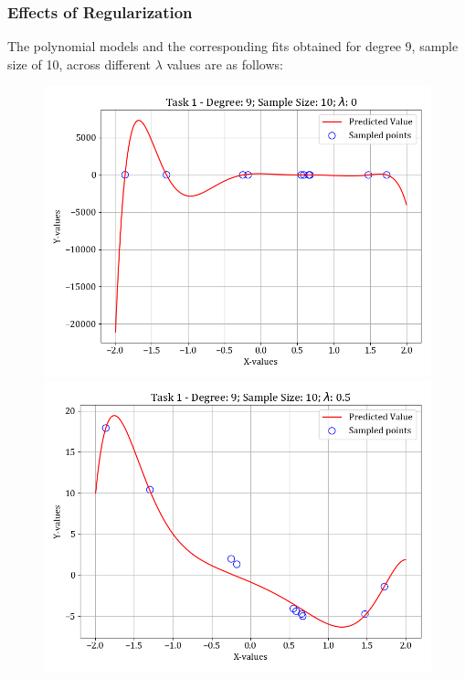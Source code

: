 \documentclass[12pt,a4paper]{article}
\begin{document}
\subsubsection{Effects of Regularization}
The polynomial models and the corresponding fits obtained for degree 9, sample size of 10, across different $\lambda$ values are as follows:
\begin{figure}[H]
    \hspace{-2em}
    \includegraphics[scale=0.45]{images/t1_d1/d_9_size_10_l_0.png}
    \includegraphics[scale=0.45]{images/t1_d1/d_9_size_10_l_0.5.png}
\end{figure}
\end{document}
